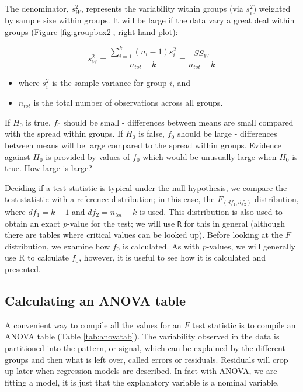 \documentclass[
  oneside]{krantz}
\providecommand{\tightlist}{%
  \setlength{\itemsep}{0pt}\setlength{\parskip}{0pt}}
\begin{document}
The denominator, \(s^2_W\), represents the variability within groups (via \(s^2_i\)) weighted by sample size within groups. It will be large if the data vary a great deal within groups (Figure \ref{fig:groupbox2}, right hand plot):

\[s^2_W = \frac{\sum_{i=1}^{k}(n_i-1)s_i^2}{n_{tot} - k} = \frac{SS_W}{n_{tot} - k}\]

\begin{itemize}
\tightlist
\item
  where \(s_i^2\) is the sample variance for group \(i\), and
\item
  \(n_{tot}\) is the total number of observations across all groups.
\end{itemize}

If \(H_0\) is true, \(f_0\) should be small - differences between means are small compared with the spread within groups. If \(H_0\) is false, \(f_0\) should be large - differences between means will be large compared to the spread within groups. Evidence against \(H_0\) is provided by values of \(f_0\) which would be unusually large when \(H_0\) is true. How large is large?

Deciding if a test statistic is typical under the null hypothesis, we compare the test statistic with a reference distribution; in this case, the \(F_{(df_1,df_2)}\) distribution, where \(df_1=k-1\) and \(df_2=n_{tot}-k\) is used. This distribution is also used to obtain an exact \(p\)-value for the test; we will use \texttt{R} for this in general (although there are tables where critical values can be looked up). Before looking at the \(F\) distribution, we examine how \(f_0\) is calculated. As with \(p\)-values, we will generally use R to calculate \(f_0\), however, it is useful to see how it is calculated and presented.

\hypertarget{calculating-an-anova-table}{%
\subsection{Calculating an ANOVA table}\label{calculating-an-anova-table}}

A convenient way to compile all the values for an \(F\) test statistic is to compile an ANOVA table (Table \ref{tab:anovatab}). The variability observed in the data is partitioned into the pattern, or signal, which can be explained by the different groups and then what is left over, called errors or residuals. Residuals will crop up later when regression models are described. In fact with ANOVA, we are fitting a model, it is just that the explanatory variable is a nominal variable.
\end{document}
